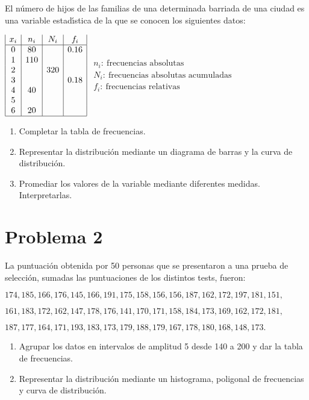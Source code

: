 \documentclass[hidequestions]{homework}
\begin{document}
	
	
	
	\problem
	\color{blue}
	El n{\'u}mero de hijos de las familias de una determinada
	barriada de una ciudad es una variable estad{\'\i}stica de la que se
	conocen los siguientes datos:
	
	\hskip 3cm $\begin{array}{|c|c|c|c|}
	x_{i} & n_{i} & N_{i} & f_{i}
	\\   \hline
	0 & 80  &     & 0\mbox{.}16 \\
	1 & 110 &     &      \\
	2 &     & 320 &      \\
	3 &     &     & 0\mbox{.}18 \\
	4 & 40  &     &      \\
	5 &     &     &      \\
	6 & 20  &     &  \\ \hline
	\end{array}$   \hskip 1.5cm $\begin{array}{l}  n_i: \ \mbox{frecuencias absolutas} \\ N_i:  \ \mbox{frecuencias absolutas acumuladas}\\ f_i:  \ \mbox{frecuencias relativas}\end{array}$
	\begin{enumerate}
		\item Completar la tabla de frecuencias.
		\item Representar la distribuci{\'o}n mediante un diagrama de
		barras y la curva de distribuci{\'o}n.
		\item Promediar los valores de la variable mediante diferentes
		medidas. Interpretarlas. \\
	\end{enumerate}
	
	\color{black}
	
	
	
	
	\section{Problema 2}
	\color{blue}
	La puntuaci{\'o}n obtenida por 50 personas que se presentaron a  una  prueba
	de selecci{\'o}n, sumadas las puntuaciones de los distintos tests, fueron:
	
	\smallskip
	\centerline{$174,185,166,176,145,166,191,175,158,156,156,187,162,172,197,181,151,$}
	\smallskip
	\centerline{$161,183,172,162,147,178,176,141,170,171,158,184,173,169,162,172,181,$}
	\smallskip
	\centerline{$187,177,164,171,193,183,173,179,188,179,167,178,180,168,148,173.$}
	\vskip -1cm
	\begin{enumerate}
		\item Agrupar los datos en intervalos de amplitud 5 desde 140 a 200 y dar la tabla de frecuencias.
		\item Representar la distribuci{\'o}n mediante un histograma, poligonal de
		frecuencias y curva de distribuci{\'o}n. \\
	\end{enumerate}
	
\end{document}
